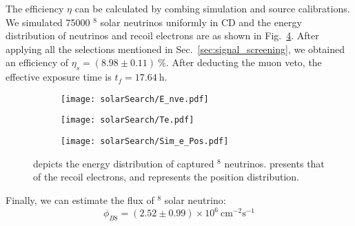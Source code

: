 The efficiency $\eta$ can be calculated by combing simulation and source calibrations. We simulated 75000 $^8$ solar neutrinos uniformly in CD and the energy distribution of neutrinos and recoil electrons are as shown in Fig.~\ref{fig:solar_sim_info}. After applying all the selections mentioned in Sec.~\ref{sec:signal_screening}, we obtained an efficiency of $\eta_s=(8.98\pm0.11)~\%$. After deducting the muon veto, the effective exposure time is $t_f=17.64~\text{h}$.

\begin{figure}[htbp]
	\centering
	\begin{subfigure}{0.5\textwidth}
		\centering
		\texttt{[image: solarSearch/E\_nve.pdf]}
		\caption{}
		\label{fig:solar_B8_sim_e}
	\end{subfigure}%
	\begin{subfigure}{0.5\textwidth}
		\centering
		\texttt{[image: solarSearch/Te.pdf]}
		\caption{}
		\label{fig:solar_B8_sim_electron}
	\end{subfigure}
	\begin{subfigure}{0.5\textwidth}
		\centering
		\texttt{[image: solarSearch/Sim\_e\_Pos.pdf]}
		\caption{}
		\label{fig:solar_B8_sim_electron_pos}
	\end{subfigure}
	\caption{ depicts the energy distribution of captured $^8$ neutrinos.  presents that of the recoil electrons, and  represents the position distribution.}
	\label{fig:solar_sim_info}
\end{figure}

Finally, we can estimate the flux of $^8$ solar neutrino: $$\phi_{B8}=(2.52\pm0.99)\times10^6~\text{cm}^{-2}\text{s}^{-1}$$

